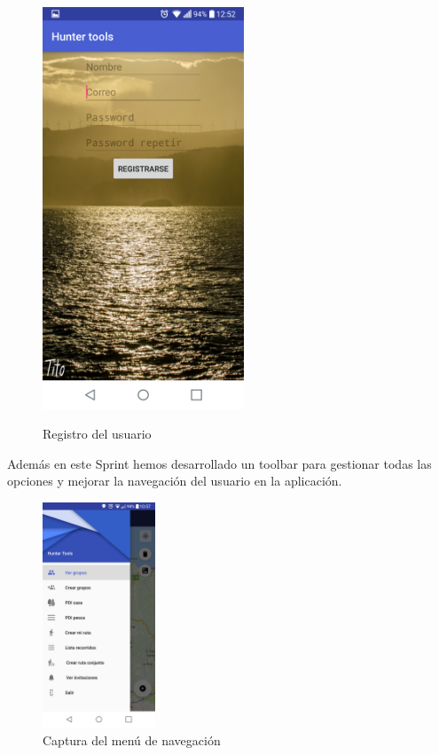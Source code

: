 \begin{figure}[htbp]
\begin{minipage}[b]{0.5\linewidth}
\end{minipage}
\hspace{0.5cm} %
\begin{minipage}[b]{0.5\linewidth}
\centering
\includegraphics[width=6cm]{capturamovil/registro.png}
 \label{figura2}
\caption{Registro del usuario }

\end{minipage}
\end{figure}
Además en este Sprint hemos desarrollado un toolbar para gestionar todas las opciones y mejorar la navegación del usuario en la aplicación.
\begin{figure}[H]
		\centering
		\includegraphics[width=0.3\textwidth] {capturamovil/opciones}
		\caption{Captura del menú de navegación}
	\end{figure}
